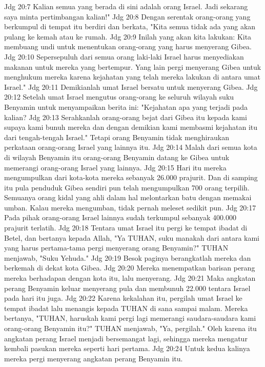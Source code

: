 Jdg 20:7  Kalian semua yang berada di sini adalah orang Israel. Jadi sekarang saya minta pertimbangan kalian!"
Jdg 20:8  Dengan serentak orang-orang yang berkumpul di tempat itu berdiri dan berkata, "Kita semua tidak ada yang akan pulang ke kemah atau ke rumah.
Jdg 20:9  Inilah yang akan kita lakukan: Kita membuang undi untuk menentukan orang-orang yang harus menyerang Gibea.
Jdg 20:10  Sepersepuluh dari semua orang laki-laki Israel harus menyediakan makanan untuk mereka yang bertempur. Yang lain pergi menyerang Gibea untuk menghukum mereka karena kejahatan yang telah mereka lakukan di antara umat Israel."
Jdg 20:11  Demikianlah umat Israel bersatu untuk menyerang Gibea.
Jdg 20:12  Setelah umat Israel mengutus orang-orang ke seluruh wilayah suku Benyamin untuk menyampaikan berita ini: "Kejahatan apa yang terjadi pada kalian?
Jdg 20:13  Serahkanlah orang-orang bejat dari Gibea itu kepada kami supaya kami bunuh mereka dan dengan demikian kami membasmi kejahatan itu dari tengah-tengah Israel." Tetapi orang Benyamin tidak menghiraukan perkataan orang-orang Israel yang lainnya itu.
Jdg 20:14  Malah dari semua kota di wilayah Benyamin itu orang-orang Benyamin datang ke Gibea untuk memerangi orang-orang Israel yang lainnya.
Jdg 20:15  Hari itu mereka mengumpulkan dari kota-kota mereka sebanyak 26.000 prajurit. Dan di samping itu pula penduduk Gibea sendiri pun telah mengumpulkan 700 orang terpilih. Semuanya orang kidal yang ahli dalam hal melontarkan batu dengan memakai umban. Kalau mereka mengumban, tidak pernah meleset sedikit pun.
Jdg 20:17  Pada pihak orang-orang Israel lainnya sudah terkumpul sebanyak 400.000 prajurit terlatih.
Jdg 20:18  Tentara umat Israel itu pergi ke tempat ibadat di Betel, dan bertanya kepada Allah, "Ya TUHAN, suku manakah dari antara kami yang harus pertama-tama pergi menyerang orang Benyamin?" TUHAN menjawab, "Suku Yehuda."
Jdg 20:19  Besok paginya berangkatlah mereka dan berkemah di dekat kota Gibea.
Jdg 20:20  Mereka menempatkan barisan perang mereka berhadapan dengan kota itu, lalu menyerang.
Jdg 20:21  Maka angkatan perang Benyamin keluar menyerang pula dan membunuh 22.000 tentara Israel pada hari itu juga.
Jdg 20:22  Karena kekalahan itu, pergilah umat Israel ke tempat ibadat lalu menangis kepada TUHAN di sana sampai malam. Mereka bertanya, "TUHAN, haruskah kami pergi lagi memerangi saudara-saudara kami orang-orang Benyamin itu?" TUHAN menjawab, "Ya, pergilah." Oleh karena itu angkatan perang Israel menjadi bersemangat lagi, sehingga mereka mengatur kembali pasukan mereka seperti hari pertama.
Jdg 20:24  Untuk kedua kalinya mereka pergi menyerang angkatan perang Benyamin itu.
